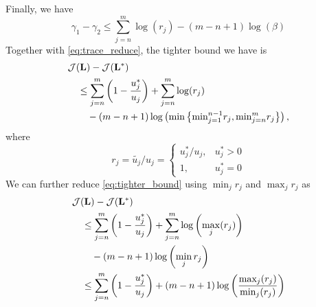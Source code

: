 \documentclass{article}
\begin{document}
Finally, we have 
\[
  \gamma_1-\gamma_2 \leq \sum_{j=n}^m \log(r_j) -(m-n+1)\log(\beta)
\]
Together with \eqref{eq:trace_reduce}, the tighter bound we have is
\begin{align}
\label{eq:tighter_bound}
  &{\cal J}({\bf L})-{\cal J}({\bf L}^*) \nonumber\\
  &\quad\leq \sum_{j=n}^m \left(1-\frac{u_j^*}{u_j}\right)+\sum_{j=n}^m \log(r_j) \nonumber\\
  &\qquad-(m-n+1)\log\left(\text{min}\left\{\text{min}_{j=1}^{n-1} r_j,\text{min}_{j=n}^{m} r_j\right\}\right),
\end{align}
where
\[
  r_j = \tilde{u_j}/u_j = \left\{\begin{array}{ll} u_j^*/u_j, & u_j^*>0 \\ 1, & u_j^*=0 \end{array}\right.
\]
We can further reduce \eqref{eq:tighter_bound} using $\min_j r_j$ and $\max_j r_j$ as
\begin{align}
\label{eq:final_bound}
  &{\cal J}({\bf L})-{\cal J}({\bf L}^*) \nonumber\\
  &\quad\leq \sum_{j=n}^m \left(1-\frac{u_j^*}{u_j}\right)+\sum_{j=n}^m \log\left(\max_j(r_j)\right) \nonumber\\
  &\qquad -(m-n+1)\log\left(\min_j r_j\right) \nonumber\\
  &\quad\leq \sum_{j=n}^m \left(1-\frac{u_j^*}{u_j}\right)+(m-n+1) \log\left(\frac{\text{max}_j(r_j)}{\text{min}_j(r_j)}\right)
\end{align}
\end{document}
